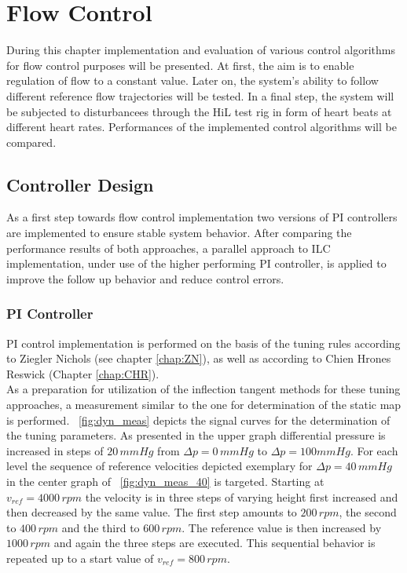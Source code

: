 \chapter{Flow Control}
During this chapter implementation and evaluation of various control algorithms for flow control purposes will be presented. At first, the aim is to enable regulation of flow to a constant value. Later on, the system's ability to follow different reference flow trajectories will be tested. In a final step, the system will be subjected to disturbancees through the HiL test rig in form of heart beats at different heart rates. Performances of the implemented control algorithms will be compared.

\section{Controller Design}
As a first step towards flow control implementation two versions of PI controllers are implemented to ensure stable system behavior. After comparing the performance results of both approaches, a parallel approach to ILC implementation, under use of the higher performing PI controller, is applied to improve the follow up behavior and reduce control errors.

\subsection{PI Controller}
PI control implementation is performed on the basis of the tuning rules according to Ziegler Nichols (see chapter \ref{chap:ZN}), as well as according to Chien Hrones Reswick (Chapter \ref{chap:CHR}).
\\As a preparation for utilization of the inflection tangent methods for these tuning approaches, a measurement similar to the one for determination of the static map is performed. \figurename~\ref{fig:dyn_meas} depicts the signal curves for the determination of the tuning parameters. As presented in the upper graph differential pressure is increased in steps of $20\,mmHg$ from $\Delta{p}=0\,mmHg$ to $\Delta{p}=100mmHg$. For each level the sequence of reference velocities depicted exemplary for $\Delta{p}=40\,mmHg$ in the center graph of \figurename~\ref{fig:dyn_meas_40} is targeted. Starting at $v_{ref}=4000 \, rpm $ the velocity is in three steps of varying height first increased and  then decreased by the same value. The first step amounts to $200 \, rpm$, the second to $400\,rpm$ and the third to $600 \, rpm$. The reference value is then increased by $1000\,rpm$ and again the three steps are executed. This sequential behavior is repeated up to a start value of $v_{ref}=800\,rpm$.


